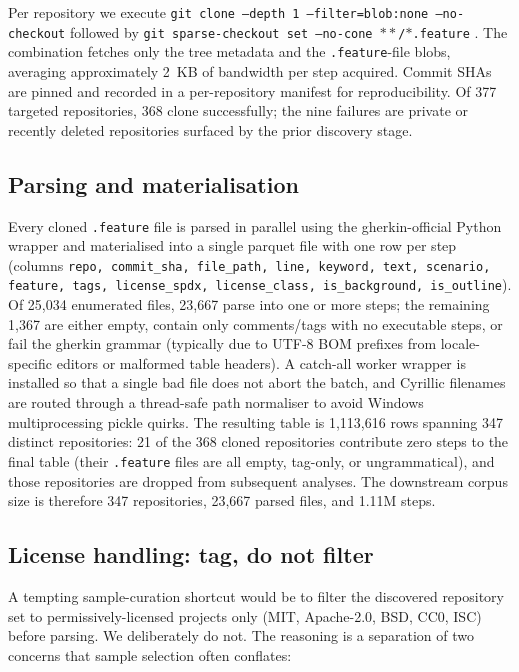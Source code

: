 \documentclass[11pt,a4paper]{article}
\begin{document}
Per repository we execute
\texttt{git clone --depth 1 --filter=blob:none --no-checkout}
\citep{git2020filter} followed by
\texttt{git sparse-checkout set --no-cone \ensuremath{\ast\!\ast}/\ensuremath{\ast}.feature}
\citep{git2020sparse}. The combination fetches only the tree metadata
and the \texttt{.feature}-file blobs, averaging approximately 2~KB of
bandwidth per step acquired. Commit SHAs are pinned and recorded in a
per-repository manifest for reproducibility. Of 377 targeted
repositories, 368 clone successfully; the nine failures are
private or recently deleted repositories surfaced by the prior
discovery stage.

\subsection{Parsing and materialisation}

Every cloned \texttt{.feature} file is parsed in parallel using the
gherkin-official Python wrapper and materialised into a single
parquet file with one row per step (columns
\texttt{repo, commit\_sha, file\_path, line, keyword, text,\allowbreak{}
scenario, feature, tags, license\_spdx, license\_class,\allowbreak{}
is\_background, is\_outline}). Of 25{,}034 enumerated files, 23{,}667 parse into
one or more steps; the remaining 1{,}367 are either empty, contain
only comments/tags with no executable steps, or fail the gherkin
grammar (typically due to UTF-8 BOM prefixes from locale-specific
editors or malformed table headers). A catch-all worker wrapper is
installed so that a single bad file does not abort the batch, and
Cyrillic filenames are routed through a thread-safe path normaliser
to avoid Windows multiprocessing pickle quirks. The resulting table
is 1{,}113{,}616 rows spanning 347 distinct repositories: 21 of the
368 cloned repositories contribute zero steps to the final table
(their \texttt{.feature} files are all empty, tag-only, or
ungrammatical), and those repositories are dropped from subsequent
analyses. The downstream corpus size is therefore 347 repositories,
23{,}667 parsed files, and 1.11M steps.

\subsection{License handling: tag, do not filter}
\label{sec:corpus:license}

A tempting sample-curation shortcut would be to filter the
discovered repository set to permissively-licensed projects only
(MIT, Apache-2.0, BSD, CC0, ISC) before parsing. We deliberately
do not. The reasoning is a separation of two concerns that sample
selection often conflates:
\end{document}
